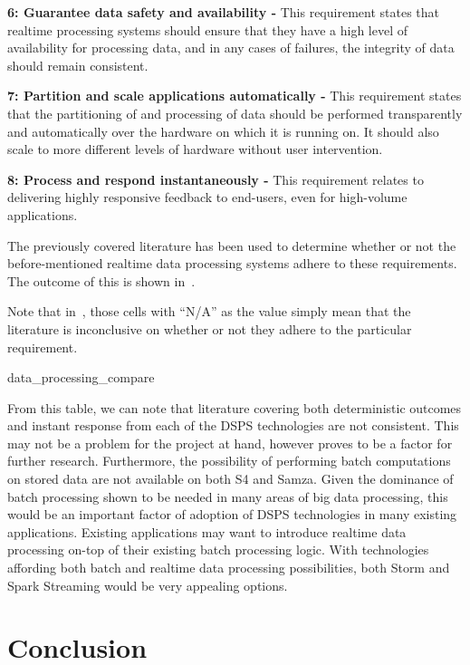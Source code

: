 \noindent \textbf{6: Guarantee data safety and availability -} This requirement states that realtime processing systems
should ensure that they have a high level of availability for processing data, and in any cases of failures, the integrity
of data should remain consistent.

\noindent \textbf{7: Partition and scale applications automatically -} This requirement states that the partitioning of
and processing of data should be performed transparently and automatically over the hardware on which it is running on.
It should also scale to more different levels of hardware without user intervention.

\noindent \textbf{8: Process and respond instantaneously -} This requirement relates to delivering highly responsive
feedback to end-users, even for high-volume applications.

The previously covered literature has been used to determine whether or not the before-mentioned realtime data processing
systems adhere to these requirements. The outcome of this is shown in~.

Note that in~, those cells with ``N/A'' as the value simply mean that the literature
is inconclusive on whether or not they adhere to the particular requirement.

{data_processing_compare}

From this table, we can note that literature covering both deterministic outcomes and instant response from each of the DSPS technologies
are not consistent. This may not be a problem for the project at hand, however proves to be a factor for further research.
Furthermore, the possibility of performing batch computations on stored data are not available on both S4 and Samza. Given
the dominance of batch processing shown to be needed in many areas of big data processing, this would be an important
factor of adoption of DSPS technologies in many existing applications. Existing applications may want to introduce realtime
data processing on-top of their existing batch processing logic. With technologies affording both batch and realtime data processing
possibilities, both Storm and Spark Streaming would be very appealing options.




\section{Conclusion} %
\label{sec:conclusion_litrev}


